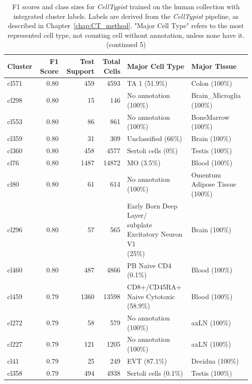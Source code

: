\begin{table}[ht!]
\scriptsize
\caption[F1 scores and class sizes for \textit{CellTypist} trained on the human collection with integrated cluster labels (continued 5)]{F1 scores and class sizes for \textit{CellTypist} trained on the human collection with integrated cluster labels. Labels are derived from the \textit{CellTypist} pipeline, as described in Chapter~\ref{chap:CT_method}. "Major Cell Type" refers to the most represented cell type, not counting cell without annotation, unless none have it. (continued 5)}
\centering
\label{table:tab_HAmodelclust5 (continued 1)}
\begin{tabular}{lrrrll}
  \toprule
Cluster & F1 Score & Test Support & Total Cells & Major Cell Type & Major Tissue \\ 
  \midrule    
  cl571 & 0.80 & 459 & 4593 & TA 1 (51.9\%) & Colon (100\%) \\ 
  cl298 & 0.80 &  15 & 146 & No annotation (100\%) & Brain\_Microglia (100\%) \\ 
  cl553 & 0.80 &  86 & 861 & No annotation (100\%) & BoneMarrow (100\%) \\ 
  cl359 & 0.80 &  31 & 309 & Unclassified (66\%) & Brain (100\%) \\ 
  cl360 & 0.80 & 458 & 4577 & Sertoli cells (0\%) & Testis (100\%) \\ 
  cl76 & 0.80 & 1487 & 14872 & MO (3.5\%) & Blood (100\%) \\ 
  cl80 & 0.80 &  61 & 614 & No annotation (100\%) & Omentum Adipose Tissue (100\%) \\ 
  cl296 & 0.80 &  57 & 565 & \specialcell[t]{Early Born Deep Layer/\\subplate Excitatory Neuron V1\\(25\%)} & Brain (100\%) \\ 
  cl460 & 0.80 & 487 & 4866 & PB Naive CD4  (0.1\%) & Blood (100\%) \\ 
  cl459 & 0.79 & 1360 & 13598 & \specialcell[t]{CD8+/CD45RA+\\Naive Cytotoxic (58.9\%)} & Blood (100\%) \\ 
  cl272 & 0.79 &  58 & 579 & No annotation (100\%) & axLN (100\%) \\ 
  cl227 & 0.79 & 121 & 1205 & No annotation (100\%) & axLN (100\%) \\ 
  cl41 & 0.79 &  25 & 249 & EVT (87.1\%) & Decidua (100\%) \\ 
  cl358 & 0.79 & 494 & 4938 & Sertoli cells (0.1\%) & Testis (100\%) \\ 

\end{tabular}
\end{table}
